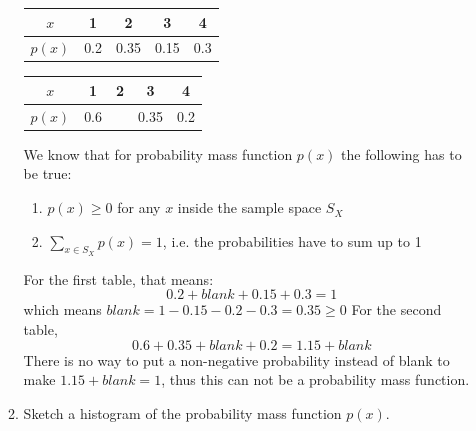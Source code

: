 \documentclass[11pt]{article}
\begin{document}
\begin{enumerate}
\begin{enumerate}
    \begin{minipage}{0.45\textwidth}
        \centering    
        \begin{tabular}{c|cccc}
            \hline
           $x$  & 1 & 2 & 3 & 4 \\
           \hline
           $p(x)$  & 0.2 & {\color{blue} 0.35} & 0.15 & 0.3\\
           \hline
        \end{tabular}
    \end{minipage}
    \begin{minipage}{0.45\textwidth}
        \centering
        \begin{tabular}{c|cccc}
            \hline
           $x$  & 1 & 2 & 3 & 4 \\
           \hline
           $p(x)$  & 0.6 &  & 0.35 & 0.2\\
           \hline
        \end{tabular}
    \end{minipage}

    {
      \color{blue}
      We know that for probability mass function $p(x)$ the following has to be true:
      \begin{enumerate}
          \item $p(x) \geq 0$ for any $x$ inside the sample space $S_X$
          \item $\displaystyle\sum_{x \in S_X} p(x) = 1$, i.e. the probabilities have to sum up to 1
      \end{enumerate}
      For the first table, that means:
      $$0.2 + blank+0.15+0.3=1$$
      which means $blank = 1-0.15-0.2-0.3=0.35 \geq 0$
      For the second table,
      $$0.6+0.35+blank+0.2 = 1.15 + blank$$
      There is no way to put a non-negative probability instead of blank to make $1.15+blank=1$, thus this can not be a probability mass function. 
    }
    \vspace{3cm}

    \item Sketch a histogram of the probability mass function $p(x)$.\\
%



\end{enumerate}
\end{enumerate}
\end{document}
